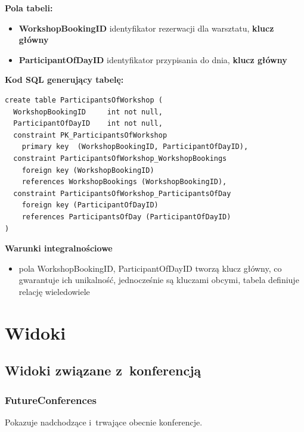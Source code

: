 \documentclass[12pt, a4paper]{mwrep}
\begin{document}
\vspace{0.5cm}

\noindent \textbf{Pola tabeli:}
\begin{itemize}
  \item \textbf{WorkshopBookingID} \ppauza identyfikator rezerwacji dla warsztatu, \textbf{klucz główny}
  \item \textbf{ParticipantOfDayID} \ppauza identyfikator przypisania do dnia, \textbf{klucz główny}
\end{itemize}

\vspace{0.5cm}
\noindent \textbf{Kod SQL generujący tabelę:}

\begin{lstlisting}
create table ParticipantsOfWorkshop (
  WorkshopBookingID     int not null,
  ParticipantOfDayID    int not null,
  constraint PK_ParticipantsOfWorkshop 
    primary key  (WorkshopBookingID, ParticipantOfDayID),
  constraint ParticipantsOfWorkshop_WorkshopBookings 
    foreign key (WorkshopBookingID) 
    references WorkshopBookings (WorkshopBookingID),
  constraint ParticipantsOfWorkshop_ParticipantsOfDay 
    foreign key (ParticipantOfDayID) 
    references ParticipantsOfDay (ParticipantOfDayID)
)
\end{lstlisting}

\vspace{0.5cm}
\noindent \textbf{Warunki integralnościowe}
\begin{itemize}
  \item pola WorkshopBookingID, ParticipantOfDayID tworzą klucz główny, co gwarantuje ich unikalność, jednocześnie są kluczami obcymi, tabela definiuje relację wiele\dywiz{}do\dywiz{}wiele
\end{itemize}

\chapter{Widoki}

\section{Widoki związane z~konferencją}

\subsection{FutureConferences}

\noindent Pokazuje nadchodzące i~trwające obecnie konferencje.
\end{document}
